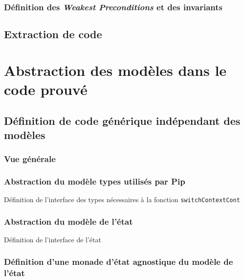 			\subsubsection{Définition des \emph{Weakest Preconditions} et des invariants}

		\subsection{Extraction de code}

		
	\section{Abstraction des modèles dans le code prouvé}

		\subsection{Définition de code générique indépendant des modèles}

			\subsubsection{Vue générale}

			\subsubsection{Abstraction du modèle types utilisés par Pip}

			\begin{listing}[!ht]
				\caption{Définition de l'interface des types nécessaires à la fonction \texttt{switchContextCont}}
				\label{code:TypesParameter}
			\end{listing}

			\subsubsection{Abstraction du modèle de l'état}

			\begin{listing}[!ht]
				\caption{Définition de l'interface de l'état}
				\label{code:StateParameter}
			\end{listing}

			\subsubsection{Définition d'une monade d'état agnostique du modèle de l'état}


